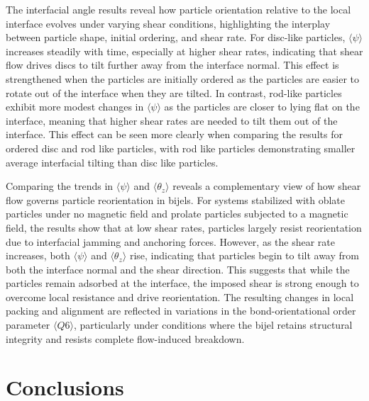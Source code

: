 The interfacial angle results reveal how particle orientation relative to the local interface evolves under varying shear conditions, highlighting the interplay between particle shape, 
initial ordering, and shear rate. For disc-like particles, $\langle \psi \rangle$ increases steadily with time, especially at higher shear rates, indicating that shear 
flow drives discs to tilt further away from the interface normal. This effect is strengthened when the particles are initially ordered as the particles are easier to rotate out of the
interface when they are tilted. In contrast, rod-like particles exhibit more modest changes in $\langle \psi \rangle$ as the particles are closer to lying flat on the interface, meaning
that higher shear rates are needed to tilt them out of the interface. This effect can be seen more clearly when comparing the results for ordered disc and rod like particles, with
rod like particles demonstrating smaller average interfacial tilting than disc like particles.  

Comparing the trends in $\langle \psi \rangle$ and $\langle \theta_z \rangle$ reveals a complementary view of how shear flow governs particle reorientation in bijels. For systems 
stabilized with oblate particles under no magnetic field and prolate particles subjected to a magnetic field, the results show that at low shear rates, particles largely resist 
reorientation due to interfacial jamming and anchoring forces. However, as the shear rate increases, both $\langle \psi \rangle$ and $\langle \theta_z \rangle$ rise, indicating that 
particles begin to tilt away from both the interface normal and the shear direction. This suggests that while the particles remain adsorbed at the interface, the imposed shear is strong 
enough to overcome local resistance and drive reorientation. The resulting changes in local packing and alignment are reflected in variations in the bond-orientational order parameter 
$\langle Q6 \rangle$, particularly under conditions where the bijel retains structural integrity and resists complete flow-induced breakdown.

\section{Conclusions}

